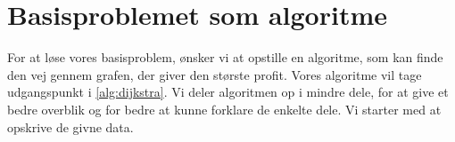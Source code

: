 \section{Basisproblemet som algoritme}
For at løse vores basisproblem, ønsker vi at opstille en algoritme, som kan finde den vej gennem grafen, der giver den største profit. Vores algoritme vil tage udgangspunkt i \autoref{alg:dijkstra}. Vi deler algoritmen op i mindre dele, for at give et bedre overblik og for bedre at kunne forklare de enkelte dele. Vi starter med at opskrive de givne data. 






